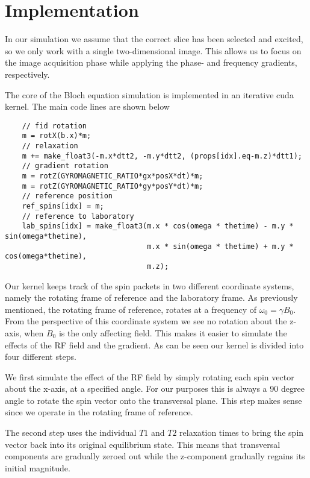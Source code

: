 \section{Implementation}



In our simulation we assume that the correct slice has been selected
and excited, so we only work with a single two-dimensional image. This
allows us to focus on the image acquisition phase while applying the
phase- and frequency gradients, respectively.

The core of the Bloch equation simulation is implemented in an
iterative cuda kernel. The main code lines are shown below

\begin{strip}
\begin{lstlisting}
    // fid rotation
    m = rotX(b.x)*m;
    // relaxation
    m += make_float3(-m.x*dtt2, -m.y*dtt2, (props[idx].eq-m.z)*dtt1);
    // gradient rotation
    m = rotZ(GYROMAGNETIC_RATIO*gx*posX*dt)*m;
    m = rotZ(GYROMAGNETIC_RATIO*gy*posY*dt)*m;
    // reference position
    ref_spins[idx] = m;
    // reference to laboratory
    lab_spins[idx] = make_float3(m.x * cos(omega * thetime) - m.y * sin(omega*thetime), 
                                 m.x * sin(omega * thetime) + m.y * cos(omega*thetime),  
                                 m.z);
\end{lstlisting}
\end{strip}

Our kernel keeps track of the spin packets in two different coordinate
systems, namely the rotating frame of reference and the laboratory
frame. As previously mentioned, the rotating frame of reference,
rotates at a frequency of $\omega_0=\gamma B_0$. From the perspective
of this coordinate system we see no rotation about the z-axis, when
$B_0$ is the only affecting field. This makes it easier to simulate
the effects of the RF field and the gradient. As can be seen our
kernel is divided into four different steps. 

We first simulate the effect of the RF field by simply rotating each
spin vector about the x-axis, at a specified angle. For our purposes
this is always a 90 degree angle to rotate the spin vector onto the
transversal plane. This step makes sense since we operate in the
rotating frame of reference.

The second step uses the individual $T1$ and $T2$ relaxation times to
bring the spin vector back into its original equilibrium state. This
means that transversal components are gradually zeroed out while the
z-component gradually regains its initial magnitude.

